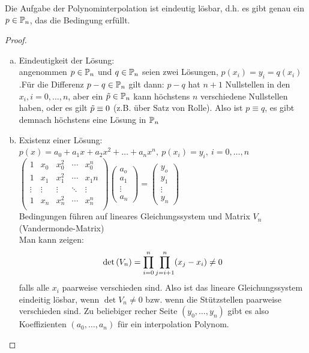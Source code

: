 \begin{theorem}
    Die Aufgabe der Polynominterpolation ist eindeutig lösbar, d.h. es gibt genau ein $p\in\mathbb{P}_n$,
    das die Bedingung erfüllt.    
\end{theorem}
\begin{proof}\hfill\\
\begin{enumerate}[(a)]
    \item Eindeutigkeit der Lösung:\\ angenommen $p\in\mathbb{P}_n$ und $q\in\mathbb{P}_n$ seien zwei Lösungen, $p(x_i)=y_i = 
    q(x_i)$.\newline Für die Differenz $p-q\in\mathbb{P}_n$ gilt dann: \newline
    $p-q$ hat $n+1$ Nullstellen in den $x_i, i=0,\dots, n$, aber ein $\Tilde{p}\in \mathbb{P}_n$ kann höchstens $n$ verschiedene 
    Nullstellen haben, oder es gilt $\Tilde{p}\equiv 0$ (z.B. über Satz von Rolle). Also ist $p\equiv q$, es gibt demnach 
    höchstens eine Lösung in $\mathbb{P}_n$ 

    \item Existenz einer Lösung:\\
    $p(x)= a_0+a_1x+a_2x^2+\dots+a_nx^n,\ p(x_i)=y_i, \ i=0,\dots,n$\\
    $\begin{pmatrix}
    1 & x_0 & x_0^2 & \cdots & x_0^n \\
    1 & x_1 & x_1^2 & \cdots & x_1n \\
    \vdots & \vdots & \vdots & \ddots & \vdots \\
    1 & x_n & x_n^2 & \cdots & x_n^n \\
    \end{pmatrix}
    \begin{pmatrix}
        a_o \\
        a_1 \\
        \vdots \\
        a_n
    \end{pmatrix} 
    =
    \begin{pmatrix}
        y_o \\
        y_1 \\
        \vdots \\
        y_n
    \end{pmatrix}$\\
    Bedingungen führen auf lineares Gleichungssystem und Matrix $V_n$ (Vandermonde-Matrix)\\
    Man kann zeigen: $$\text{det}\left(V_n\right)=\displaystyle\prod^n_{i=0}\displaystyle\prod^n_{j=i+1} (x_j-x_i) \neq 0 $$falls alle $x_i$ paarweise verschieden 
    sind. Also ist das lineare Gleichungssystem eindeitig lösbar, wenn $\det{V_n}\neq 0$ bzw. wenn die Stützstellen paarweise verschieden sind. Zu beliebiger recher Seite 
    $(y_0,\dots,y_n)$ gibt es also Koeffizienten $(a_0,\dots,a_n)$ für ein interpolation Polynom.\\
\end{enumerate}
\end{proof}


